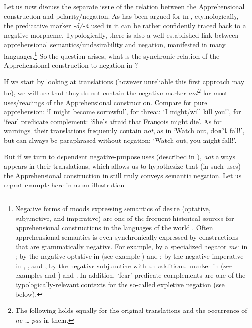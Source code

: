 \documentclass[output=paper,colorlinks,citecolor=brown]{langscibook}
\begin{document}
Let us now discuss the separate issue of the relation between the Apprehensional construction and polarity\slash negation. As has been argued for in , etymologically, the predicative marker \textit{-a̋/-ǎ} used in it can be rather confidently traced back to a negative morpheme. Typologically, there is also a well-established link between apprehensional semantics\slash undesirability and negation, manifested in many languages.\footnote{Negative forms of moods expressing semantics of desire (optative, subjunctive, and imperative) are one of the frequent historical sources for apprehensional constructions in the languages of the world \citep[49]{Dobrushina2006}. Often apprehensional semantics is even synchronically expressed by constructions that are grammatically negative. For example, by a specialized negator \textit{meː} in  \citep[311--313]{lichtenberk1995}; by the negative optative in   (see example ) and ; by the negative imperative in , , and ; by the negative subjunctive with an additional marker in  (see examples  and ) and  \citep[32--33, 36--39]{Dobrushina2006}. In addition, `fear' predicate complements are one of the typologically-relevant contexts for the so-called expletive negation \citep{jinkoenig2020} (see below).} So the question arises, what is the synchronic relation of the Apprehensional construction to negation in ?

If we start by looking at  translations (however unreliable this first approach may be), we will see that they do not contain the negative marker \textit{not}\footnote{The following holds equally for the original  translations and the occurrence of \textit{ne {\dots} pas} in them.} for most uses\slash readings of the Apprehensional construction. Compare for pure apprehension: `I might become sorrowful', for threat: `I might\slash will kill you!', for `fear' predicate complement: `She's afraid that François might die'. As for warnings, their translations frequently contain \textit{not}, as in `Watch out, do\textbf{n't} fall!', but can always be paraphrased without negation: `Watch out, you might fall!'.

But if we turn to dependent negative-purpose uses (described in ), \textit{not} always appears in their translations, which allows us to hypothesize that (in such uses) the Apprehensional construction in  still truly conveys semantic negation. Let us repeat example  here in  as an illustration.
\end{document}
